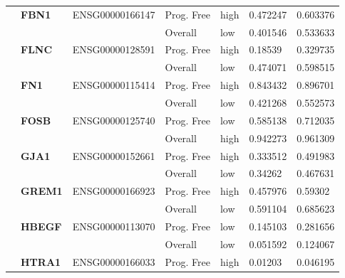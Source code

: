 \begin{spacing}{1}
{\begin{longtable}{|>{\bfseries}p{2cm}|>{\bfseries}p{1.9cm}|p{2.8cm}|p{2cm}|p{2cm}|p{1.5cm}|p{1.5cm}|}
            \hhline{~======}
             & FBN1     & ENSG00000166147 & Prog. Free & high & 0.472247 & 0.603376                \\
            \hhline{~~~----}
             &          &                 & Overall    & low  & 0.401546 & 0.533633                \\
            \hhline{~======}
             & FLNC     & ENSG00000128591 & Prog. Free & high & 0.18539  & 0.329735                \\
            \hhline{~~~----}
             &          &                 & Overall    & low  & 0.474071 & 0.598515                \\
            \hhline{~======}
             & FN1      & ENSG00000115414 & Prog. Free & high & 0.843432 & 0.896701                \\
            \hhline{~~~----}
             &          &                 & Overall    & low  & 0.421268 & 0.552573                \\
            \hhline{~======}
             & FOSB     & ENSG00000125740 & Prog. Free & low  & 0.585138 & 0.712035                \\
            \hhline{~~~----}
             &          &                 & Overall    & high & 0.942273 & 0.961309                \\
            \hhline{~======}
            \multirow{2}{3cm}{False}
             & GJA1     & ENSG00000152661 & Prog. Free & high & 0.333512 & 0.491983                \\
            \hhline{~~~----}
             &          &                 & Overall    & low  & 0.34262  & 0.467631                \\
            \hhline{~======}
             & GREM1    & ENSG00000166923 & Prog. Free & high & 0.457976 & 0.59302                 \\
            \hhline{~~~----}
             &          &                 & Overall    & low  & 0.591104 & 0.685623                \\
            \hhline{~======}
             & HBEGF    & ENSG00000113070 & Prog. Free & low  & 0.145103 & 0.281656                \\
            \hhline{~~~----}
             &          &                 & Overall    & low  & 0.051592 & 0.124067                \\
            \hhline{~======}
             & HTRA1    & ENSG00000166033 & Prog. Free & high & 0.01203  & 0.046195                \\

\end{longtable}}
\end{spacing}
